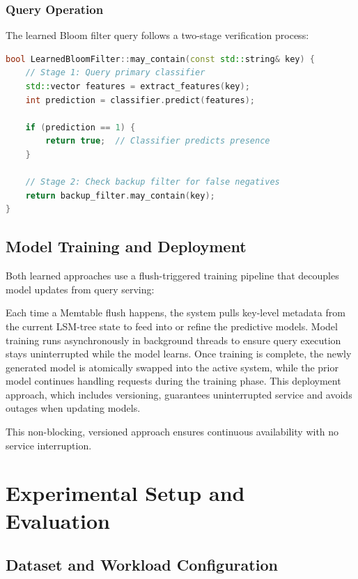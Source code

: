 \documentclass{mnitjaipur}
\begin{document}
\subsubsection{Query Operation}

The learned Bloom filter query follows a two-stage verification process:

\begin{lstlisting}[language=C++, caption={Learned Bloom filter query}, label={lst:learned-bloom-query}]
bool LearnedBloomFilter::may_contain(const std::string& key) {
    // Stage 1: Query primary classifier
    std::vector features = extract_features(key);
    int prediction = classifier.predict(features);
    
    if (prediction == 1) {
        return true;  // Classifier predicts presence
    }
    
    // Stage 2: Check backup filter for false negatives
    return backup_filter.may_contain(key);
}
\end{lstlisting}

\subsection{Model Training and Deployment}

Both learned approaches use a flush-triggered training pipeline that decouples model updates from query serving:

Each time a Memtable flush happens, the system pulls key-level metadata from the current LSM-tree state to feed into or refine the predictive models. Model training runs asynchronously in background threads to ensure query execution stays uninterrupted while the model learns. Once training is complete, the newly generated model is atomically swapped into the active system, while the prior model continues handling requests during the training phase. This deployment approach, which includes versioning, guarantees uninterrupted service and avoids outages when updating models. 

This non-blocking, versioned approach ensures continuous availability with no service interruption.

\section{Experimental Setup and Evaluation}

\subsection{Dataset and Workload Configuration}
\end{document}
